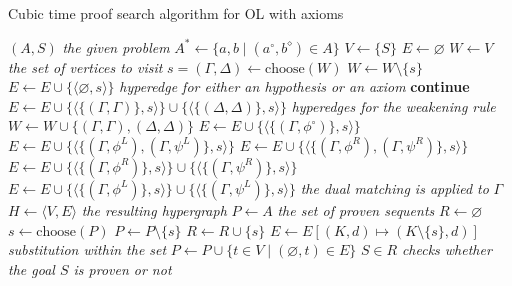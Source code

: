 \documentclass[a4paper, 11pt]{article}
\begin{document}
    \begin{algorithm}
	    \caption{Cubic time proof search algorithm for OL with axioms}
	    \label{proof_search_algo}
    \begin{algorithmic}
	    \State $(A,S)$ \textit{the given problem}
	    \State $A^*\gets\{a,b\mid(a^\circ,b^\diamond)\in A\}$
	    \State $V\gets \{S\}$	
	    \State $E\gets\varnothing$
	    \State $W\gets V$ \textit{the set of vertices to visit}   
	    \State $s=(\Gamma,\Delta)\gets\text{choose}(W)$
	    \State $W\gets W\setminus\{s\}$
	    \State $E\gets E\cup\{\langle\varnothing,s\rangle\}$ 
	    \textit{hyperedge for either an hypothesis or an axiom}
	    \State\textbf{continue}
	    \EndIf
	    \State $E\gets E\cup\{\langle\{(\Gamma,\Gamma)\},s\rangle\}\cup
	    \{\langle\{(\Delta,\Delta)\},s\rangle\}$ \textit{hyperedges for the weakening rule}
	    \State $W\gets W\cup\{(\Gamma,\Gamma),(\Delta,\Delta)\}$
	    \If {$\Delta=\neg\phi^\circ$}
	    \State $E\gets E\cup\{\langle\{(\Gamma,\phi^\circ)\},s\rangle\}$
	    \State $E\gets E\cup\{\langle\{(\Gamma,\phi^L),(\Gamma,\psi^L)\},s\rangle\}$
	    \State $E\gets E\cup\{\langle\{(\Gamma,\phi^R),(\Gamma,\psi^R)\},s\rangle\}$
	    \State $E\gets E\cup\{\langle\{(\Gamma,\phi^R)\},s\rangle\}\cup
	    \{\langle\{(\Gamma,\psi^R)\},s\rangle\}$
	    \State $E\gets E\cup\{\langle\{(\Gamma,\phi^L)\},s\rangle\}\cup
	    \{\langle\{(\Gamma,\psi^L)\},s\rangle\}$
	    \EndIf
	    \State \textit{the dual matching is applied to }$\Gamma$ 
	    \EndWhile
	    \State $H\gets\langle V,E\rangle$ \textit{the resulting hypergraph}
	    \State $P\gets A$ \textit{the set of proven sequents}
	    \State $R\gets \varnothing$
	    \State $s\gets \text{choose}(P)$
	    \State $P\gets P\setminus\{s\}$
	    \State $R\gets R\cup\{s\}$
	    \State $E\gets E[(K,d)\mapsto (K\setminus\{s\},d)]$ \textit{substitution within the set}
	    \State $P\gets P\cup\{t\in V\mid(\varnothing,t)\in E\}$  
	    \EndWhile
	    \State \Return $S\in R$ \textit{checks whether the goal $S$ is proven or not}
    \end{algorithmic}
    \end{algorithm}
\end{document}
